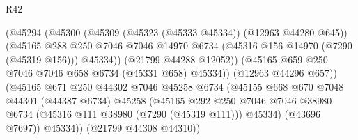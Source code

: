 \begin{lexlean}{R42}
\begin{coremodule}
{                                          (@45294
                                            (@45300
                                              (@45309 (@45323 (@45333 @45334)) (@12963 @44280 @645))
                                              (@45165
                                                @288
                                                @250
                                                @7046
                                                @7046
                                                @14970
                                                @6734
                                                (@45316 @156 @14970 (@7290 (@45319 @156)))
                                                @45334))
                                            (@21799 @44288 @12052))
                                          (@45165
                                            @659
                                            @250
                                            @7046
                                            @7046
                                            @658
                                            @6734
                                            (@45331 @658)
                                            @45334))
                                        (@12963 @44296 @657))
                                      (@45165
                                        @671
                                        @250
                                        @44302
                                        @7046
                                        @45258
                                        @6734
                                        (@45155
                                          @668
                                          @670
                                          @7048
                                          @44301
                                          (@44387 @6734)
                                          @45258
                                          (@45165
                                            @292
                                            @250
                                            @7046
                                            @7046
                                            @38980
                                            @6734
                                            (@45316 @111 @38980 (@7290 (@45319 @111)))
                                            @45334)
                                          (@43696 @7697))
                                        @45334))
                                    (@21799 @44308 @44310))
}
\end{coremodule}
\end{lexlean}
